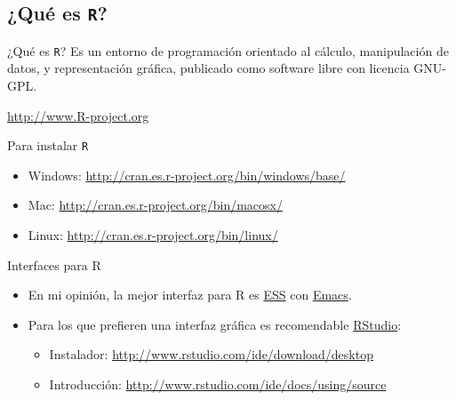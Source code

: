 \documentclass[xcolor={usenames,svgnames,dvipsnames}]{beamer}
\begin{document}
\subsection{¿Qué es \texttt{R}?}
\label{sec-1-2}
\begin{frame}[fragile,label=sec-1-2-1]{¿Qué es \texttt{R}?}
 Es un entorno de programación orientado al cálculo, manipulación de datos, y representación gráfica, publicado como software libre con licencia GNU-GPL.
\begin{center}
\url{http://www.R-project.org} 
\end{center}
\end{frame}

\begin{frame}[fragile,label=sec-1-2-2]{Para instalar \texttt{R}}
 \begin{itemize}
\item Windows: \url{http://cran.es.r-project.org/bin/windows/base/}
\item Mac: \url{http://cran.es.r-project.org/bin/macosx/}
\item Linux: \url{http://cran.es.r-project.org/bin/linux/}
\end{itemize}
\end{frame}

\begin{frame}[label=sec-1-2-3]{Interfaces para R}
\begin{itemize}
\item En mi opinión, la mejor interfaz para R es \href{http://ess.r-project.org/}{ESS} con \href{http://www.gnu.org/software/emacs/}{Emacs}.
\item Para los que prefieren una interfaz gráfica es recomendable \href{http://www.rstudio.com/ide/}{RStudio}:
\begin{itemize}
\item Instalador: \url{http://www.rstudio.com/ide/download/desktop}
\item Introducción: \url{http://www.rstudio.com/ide/docs/using/source}
\end{itemize}
\end{itemize}
\end{frame}
\end{document}
